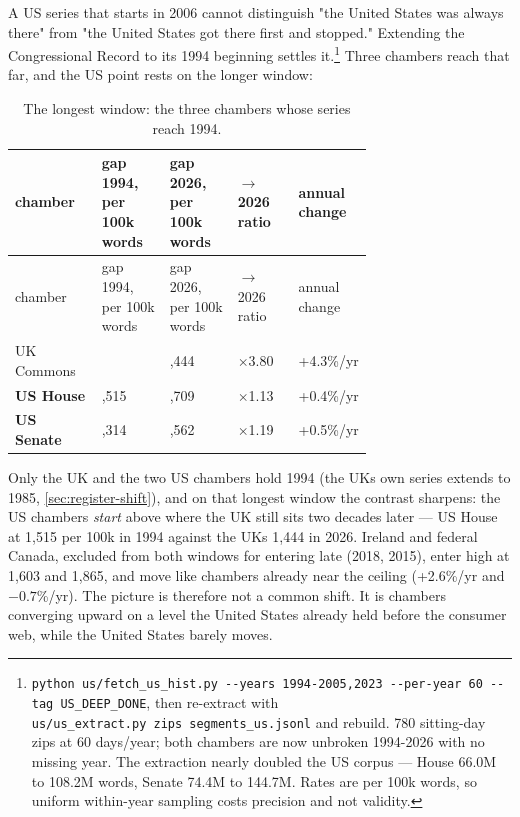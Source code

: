 A US series that starts in 2006 cannot distinguish "the United States was always there" from "the United States got there first and stopped." Extending the Congressional Record to its 1994 beginning settles it.\footnote{\texttt{python\ us/\allowbreak{}fetch\_\allowbreak{}us\_\allowbreak{}hist.\allowbreak{}py\ -\allowbreak{}\/\allowbreak{}-\allowbreak{}years\ 1994-\allowbreak{}2005,2023\ -\allowbreak{}\/\allowbreak{}-\allowbreak{}per-\allowbreak{}year\ 60\ -\allowbreak{}\/\allowbreak{}-\allowbreak{}tag\ US\_\allowbreak{}DEEP\_\allowbreak{}DONE}, then re-extract with \texttt{us/\allowbreak{}us\_\allowbreak{}extract.\allowbreak{}py\ zips\ segments\_\allowbreak{}us.\allowbreak{}jsonl} and rebuild. 780 sitting-day zips at 60 days/year;
  both chambers are now unbroken 1994-2026 with no missing year. The
  extraction nearly doubled the US corpus --- House 66.0M to 108.2M words,
  Senate 74.4M to 144.7M. Rates are per 100k words, so uniform within-year
  sampling costs precision and not validity.} Three chambers reach that far, and the US point rests on the longer window:

\begingroup\small
\begin{longtable}[]{@{}l>{\raggedright\arraybackslash}p{0.19\linewidth}>{\raggedright\arraybackslash}p{0.19\linewidth}>{\raggedright\arraybackslash}p{0.17\linewidth}>{\raggedright\arraybackslash}p{0.16\linewidth}@{}}
\caption{The longest window: the three chambers whose series reach 1994.}\label{tab:climb-long}\\
\toprule\noalign{}
chamber & gap 1994, per 100k words & gap 2026, per 100k words & 1994\(\rightarrow\)2026 ratio & annual change \\
\midrule\noalign{}
\endfirsthead
\toprule\noalign{}
chamber & gap 1994, per 100k words & gap 2026, per 100k words & 1994\(\rightarrow\)2026 ratio & annual change \\
\midrule\noalign{}
\endhead
\bottomrule\noalign{}
\endlastfoot
UK Commons & 380 & 1,444 & \(\times\)3.80 & +4.3\%/yr \\
\textbf{US House} & 1,515 & 1,709 & \(\times\)1.13 & +0.4\%/yr \\
\textbf{US Senate} & 1,314 & 1,562 & \(\times\)1.19 & +0.5\%/yr \\
\end{longtable}
\endgroup

Only the UK and the two US chambers hold 1994 (the UK\textquotesingle s own series extends
to 1985, \cref{sec:register-shift}), and on that longest window the contrast sharpens: the US
chambers \emph{start} above where the UK still sits two decades later --- US House
at 1,515 per 100k in 1994 against the UK\textquotesingle s 1,444 in 2026. Ireland and
federal Canada, excluded from both windows for entering late (2018, 2015),
enter high at 1,603 and 1,865, and move like chambers already near the
ceiling (+2.6\%/yr and \(-0.7\)\%/yr). The picture is therefore not a common
shift. It is chambers converging upward on a level the United States
already held before the consumer web, while the United States barely moves.

